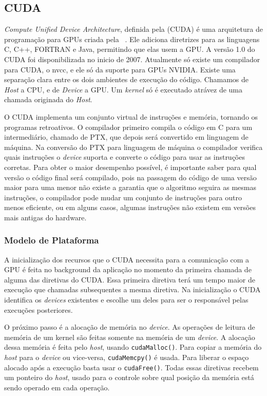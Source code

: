 \subsection{CUDA}
\textit{Compute Unified Device Architecture}, definida pela (CUDA) é uma arquitetura de programação para GPUs criada
pela ~\cite{nvidia2007compute}.
Ele adiciona diretrizes para as linguagens C, C++, FORTRAN e Java, permitindo que elas usem a GPU.
A versão 1.0 do CUDA foi disponibilizada no inicio de 2007. Atualmente só existe um compilador para CUDA, o nvcc,
e ele só da suporte para GPUs NVIDIA. Existe uma separação clara entre os dois
ambientes de execução do código. Chamamos de \textit{Host} a CPU, e de \textit{Device}
a GPU. Um \textit{kernel} só é executado atrávez de uma chamada originada do \textit{Host}.

O CUDA implementa um conjunto virtual de instruções e memória, tornando os programas retroativos. O compilador
primeiro compila o código em C para um intermediário, chamado de PTX, que depois será convertido em linguagem
de máquina. Na conversão do PTX para linguagem de máquina o compilador verifica quais instruções o \textit{device}
suporta e converte o código para usar as instruções corretas.
Para obter o maior desempenho possível, é importante saber para qual versão o código final será compilado,
pois na passagem do código de uma versão maior para uma menor não existe a garantia que o algoritmo seguira as mesmas instruções,
o compilador pode mudar um conjunto de instruções para outro menos eficiente, ou em alguns casos, algumas instruções não existem em
versões mais antigas do hardware.

\subsubsection{Modelo de Plataforma}
A inicialização dos recursos que o CUDA necessita para a comunicação com a GPU é feita no background da
aplicação no momento da primeira chamada de alguma das diretivas do CUDA. Essa primeira diretiva terá um
tempo maior de execução que chamadas subsequentes a mesma diretiva. Na inicialização o CUDA identifica
os \textit{devices} existentes e escolhe um deles para ser o responsável pelas execuções posteriores.

O próximo passo é a alocação de memória no \textit{device}. As operações de leitura de memória de um kernel são feitas somente
na memória de um \textit{device}. A alocação dessa memória é feita pelo \textit{host}, usando \verb#cudaMalloc()#.
Para copiar a memória do \textit{host} para o \textit{device} ou vice-versa,
\verb#cudaMemcpy()# é usada. Para liberar o espaço alocado após a execução basta usar o \verb#cudaFree()#.
Todas essas diretivas recebem um ponteiro do \textit{host}, usado para o controle sobre qual posição da memória está sendo
operado em cada operação.

